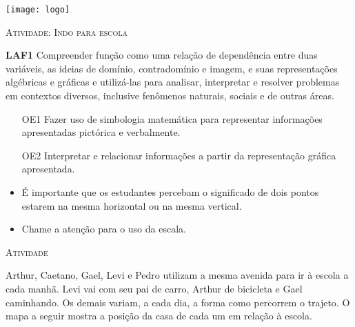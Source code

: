 \documentclass[10 pt,usenames,dvipsnames, oneside]{article}
\begin{document}
\begin{center}
  \begin{minipage}[l]{3cm}
\texttt{[image: logo]}    
\end{minipage}\hfill
\begin{minipage}[r]{.8\textwidth}
 {\Large \scshape Atividade: Indo para escola}  
\end{minipage}
\end{center}
\vspace{.2cm}

\ifdefined\prof
\begin{objetivos}
\item \textbf{LAF1} Compreender função como uma relação de dependência entre duas variáveis, as ideias de domínio, contradomínio e imagem, e suas representações algébricas e gráficas e utilizá-las para analisar, interpretar e resolver problemas em contextos diversos, inclusive fenômenos naturais, sociais e de outras áreas.
\end{objetivos}

\begin{goals}
\begin{enumerate}

\item[OE1] Fazer uso de simbologia matemática para representar informações apresentadas pictórica e verbalmente.

\item[OE2] Interpretar e relacionar informações a partir da representação gráfica apresentada.

\end{enumerate}

\tcblower

\begin{itemize}
\item É importante que os estudantes percebam o significado de dois pontos estarem na mesma horizontal ou na mesma vertical.

\item Chame a atenção para o uso da escala.
\end{itemize}

\end{goals}

\bigskip
\begin{center}
{\large \scshape Atividade}
\end{center}
\fi

Arthur, Caetano, Gael, Levi e Pedro utilizam a mesma avenida para ir à escola a cada manhã. Levi vai com seu pai de carro, Arthur de bicicleta e Gael caminhando. Os demais variam, a cada dia, a forma como percorrem o trajeto. O mapa a seguir mostra a posição da casa de cada um em relação à escola.
\label{\detokenize{AF106-5:fig-mapa-escola}}
\end{document}
